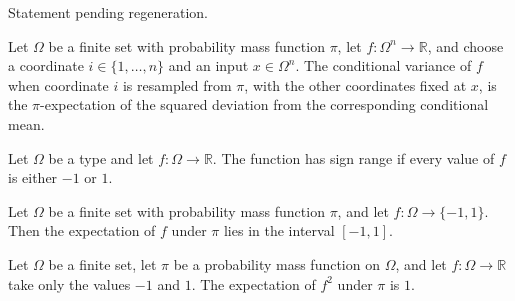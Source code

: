 \begin{theorem}
\label{FABL.coordinateProjection_apply}
\leanok
{}
Statement pending regeneration.
\end{theorem}

\begin{definition}
\label{FABL.coordinateConditionalVariance}
\leanok
{}
Let $\Omega$ be a finite set with probability mass function $\pi$, let
$f\colon\Omega^n\to\mathbb{R}$, and choose a coordinate $i\in\{1,\ldots,n\}$ and an
input $x\in\Omega^n$. The conditional variance of $f$ when coordinate $i$ is resampled
from $\pi$, with the other coordinates fixed at $x$, is the $\pi$-expectation of the
squared deviation from the corresponding conditional mean.
\end{definition}

\begin{definition}
\label{FABL.HasSignRange}
\leanok
Let $\Omega$ be a type and let $f:\Omega\to\mathbb{R}$. The function has sign range if
every value of $f$ is either $-1$ or $1$.
\end{definition}

\begin{theorem}
\label{FABL.pmfExpectation_mem_Icc_of_hasSignRange}
\leanok
{}
Let $\Omega$ be a finite set with probability mass function $\pi$, and let
$f:\Omega\to\{-1,1\}$. Then the expectation of $f$ under $\pi$ lies in the interval
$[-1,1]$.
\end{theorem}

\begin{theorem}
\label{FABL.pmfExpectation_sq_eq_one_of_hasSignRange}
\leanok
{}
Let $\Omega$ be a finite set, let $\pi$ be a probability mass function on $\Omega$, and
let $f:\Omega\to\mathbb{R}$ take only the values $-1$ and $1$. The expectation of $f^2$
under $\pi$ is $1$.
\end{theorem}

